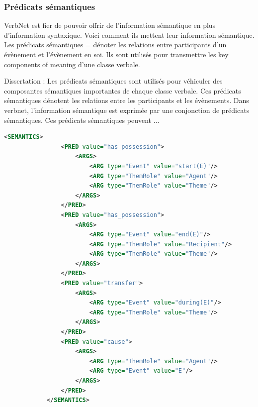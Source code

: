 \subsubsection{Prédicats sémantiques}

VerbNet est fier de pouvoir offrir de l'information sémantique en plus d'information syntaxique. Voici comment ils mettent leur information sémantique.
Les prédicats sémantiques = dénoter les relations entre participants d'un évènement et l'évènement en soi. Ils sont utilisés pour transmettre les key components of meaning d'une classe verbale.

Dissertation : Les prédicats sémantiques sont utilisés pour véhiculer des composantes sémantiques importantes de chaque classe verbale. Ces prédicats sémantiques dénotent les relations entre les participants et les évènements. Dans verbnet, l'information sémantique est exprimée par une conjonction de prédicats sémantiques. Ces prédicats sémantiques peuvent ...

\begin{lstlisting}[language=Xml, caption=Les prédicats sémantiques]
<SEMANTICS>
                <PRED value="has_possession">
                    <ARGS>
                        <ARG type="Event" value="start(E)"/>
                        <ARG type="ThemRole" value="Agent"/>
                        <ARG type="ThemRole" value="Theme"/>
                    </ARGS>
                </PRED>
                <PRED value="has_possession">
                    <ARGS>
                        <ARG type="Event" value="end(E)"/>
                        <ARG type="ThemRole" value="Recipient"/>
                        <ARG type="ThemRole" value="Theme"/>
                    </ARGS>
                </PRED>
                <PRED value="transfer">
                    <ARGS>
                        <ARG type="Event" value="during(E)"/>
                        <ARG type="ThemRole" value="Theme"/>
                    </ARGS>
                </PRED>
                <PRED value="cause">
                    <ARGS>
                        <ARG type="ThemRole" value="Agent"/>
                        <ARG type="Event" value="E"/>
                    </ARGS>
                </PRED>
            </SEMANTICS>
\end{lstlisting}

